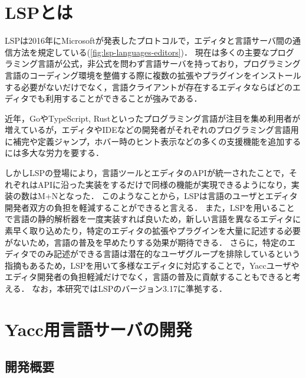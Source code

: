 \documentclass[fontsize=9bp,twocolumn,column_gap=2.36zw,a4paper,report]{jlreq}
\begin{document}
\chapter{LSPとは}

LSPは2016年にMicrosoftが発表したプロトコルで，エディタと言語サーバ間の通信方法を規定している(\ref{fig:lsp-languages-editors})．
現在は多くの主要なプログラミング言語が公式，非公式を問わず言語サーバを持っており\cite{lsp_impl}，プログラミング言語のコーディング環境を整備する際に複数の拡張やプラグインをインストールする必要がないだけでなく，言語クライアントが存在するエディタならばどのエディタでも利用することができることが強みである．\par
近年，GoやTypeScript, Rustといったプログラミング言語が注目を集め利用者が増えているが，エディタやIDEなどの開発者がそれぞれのプログラミング言語用に補完や定義ジャンプ，ホバー時のヒント表示などの多くの支援機能を追加するには多大な労力を要する．
\begin{figure}[h]
\end{figure}

しかしLSPの登場により，言語ツールとエディタのAPIが統一されたことで，それぞれはAPIに沿った実装をするだけで同様の機能が実現できるようになり，実装の数はM+Nとなった．
このようなことから，LSPは言語のユーザとエディタ開発者双方の負担を軽減することができると言える．
また，LSPを用いることで言語の静的解析器を一度実装すれば良いため，新しい言語を異なるエディタに素早く取り込めたり，特定のエディタの拡張やプラグインを大量に記述する必要がないため，言語の普及を早めたりする効果が期待できる．
さらに，特定のエディタでのみ記述ができる言語は潜在的なユーザグループを排除しているという指摘\cite{decoupling}もあるため，LSPを用いて多様なエディタに対応することで，Yaccユーザやエディタ開発者の負担軽減だけでなく，言語の普及に貢献することもできると考える．
なお，本研究ではLSPのバージョン3.17に準拠する．
\newline

\chapter{Yacc用言語サーバの開発}
\section{開発概要}
\end{document}
